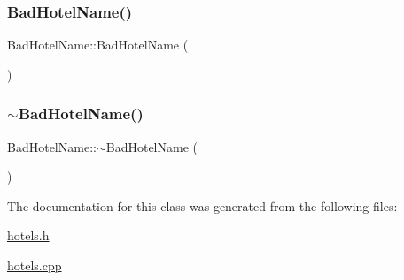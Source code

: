 \subsubsection{\texorpdfstring{Bad\+Hotel\+Name()}{BadHotelName()}}
{\footnotesize\ttfamily Bad\+Hotel\+Name\+::\+Bad\+Hotel\+Name (\begin{DoxyParamCaption}{ }\end{DoxyParamCaption})\hspace{0.3cm}{\ttfamily [inline]}}

\mbox{\label{class_bad_hotel_name_aa2ad2390a5422aacbb9c61109957d58a}} 
\subsubsection{\texorpdfstring{$\sim$\+Bad\+Hotel\+Name()}{~BadHotelName()}}
{\footnotesize\ttfamily Bad\+Hotel\+Name\+::$\sim$\+Bad\+Hotel\+Name (\begin{DoxyParamCaption}{ }\end{DoxyParamCaption})\hspace{0.3cm}{\ttfamily [virtual]}}



The documentation for this class was generated from the following files\+:\begin{DoxyCompactItemize}
\item 
\hyperlink{hotels_8h}{hotels.\+h}\item 
\hyperlink{hotels_8cpp}{hotels.\+cpp}\end{DoxyCompactItemize}
